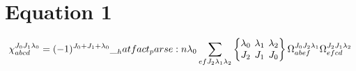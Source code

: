 \documentclass{scrartcl}
\newcommand{\sixj}[6]{\begingroup\setlength{\arraycolsep}{0.2em}\begin{Bmatrix} #1 & #2 & #3 \\ #4 & #5 & #6 \end{Bmatrix}\endgroup}
\begin{document}
\section{Equation 1}
\begin{dmath*}
\chi_{a b c d}^{{J}_{0} {J}_{1} {{\lambda}}_{0}} = (-1)^{{J}_{0}+{J}_{1}+{{\lambda}}_{0}} \* \hatfact{{{\lambda}}_{0}} \* \sum_{e f {J}_{2} {{\lambda}}_{1} {{\lambda}}_{2}} \* \sixj{{{\lambda}}_{0}}{{{\lambda}}_{1}}{{{\lambda}}_{2}}{{J}_{2}}{{J}_{1}}{{J}_{0}} \* \Omega_{a b e f}^{{J}_{0} {J}_{2} {{\lambda}}_{1}} \* \Omega_{e f c d}^{{J}_{2} {J}_{1} {{\lambda}}_{2}}
\end{dmath*}
\end{document}
